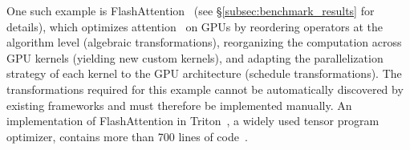 One such example is FlashAttention~\cite{dao2023flash} (see \S\ref{subsec:benchmark_results} for details), which optimizes attention~\cite{transformers} on GPUs by reordering operators at the algorithm level (algebraic transformations), reorganizing the computation across GPU kernels (yielding new custom kernels), and adapting the parallelization strategy of each kernel to the GPU architecture (schedule transformations).
%
The transformations required for this example cannot be automatically discovered by existing frameworks and must therefore be implemented manually.
%
%
%
An implementation of FlashAttention in Triton~\cite{tillet2019triton}, a widely used tensor program optimizer, contains more than 700 lines of code~\cite{triton-flashattention}.


